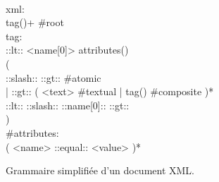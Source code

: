 \begin{figure}

\begin{bigpre}
\\
xml: \\
    tag()+ #root \\
tag: \\
    ::lt:: <name[0]> attributes() \\
    ( \\
      ::slash:: ::gt:: #atomic \\
    | ::gt:: ( <text> #textual | tag() #composite )* \\
      ::lt:: ::slash:: ::name[0]:: ::gt:: \\
    ) \\
#attributes: \\
    ( <name> ::equal:: <value> )*
\end{bigpre}

\caption{\label{figure:data:xml} Grammaire simplifiée d'un document XML.}

\end{figure}

